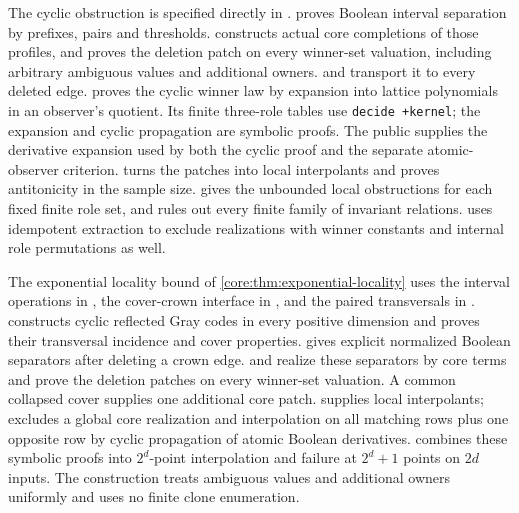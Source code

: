The cyclic obstruction is specified directly in
.
 proves Boolean interval separation by
prefixes, pairs and thresholds.  constructs
actual core completions of those profiles, and
 proves the deletion patch on every
winner-set valuation, including arbitrary ambiguous values and additional
owners.  and
 transport it to every deleted edge.
 proves the cyclic winner law by
expansion into lattice polynomials in an observer's quotient. Its finite
three-role tables use \texttt{decide +kernel}; the expansion and cyclic
propagation are symbolic proofs. The public
 supplies the derivative expansion used
by both the cyclic proof and the separate atomic-observer criterion. 
turns the patches into local interpolants and proves antitonicity in the
sample size.  gives the unbounded
local obstructions for each fixed finite role set, and
 rules out every finite
family of invariant relations. 
uses idempotent extraction to exclude realizations with winner constants
and internal role permutations as well.

The exponential locality bound of \cref{core:thm:exponential-locality}
uses the interval operations in ,
the cover-crown interface in , and
the paired transversals in .
 constructs cyclic reflected Gray codes in
every positive dimension and proves their transversal incidence and cover
properties.  gives explicit normalized
Boolean separators after deleting a crown edge.
 and
 realize these separators by
core terms and prove the deletion patches on every winner-set valuation.
A common collapsed cover supplies one additional core patch.
 supplies local interpolants;
 excludes a global core
realization and interpolation on all matching rows plus one opposite row
by cyclic propagation of atomic Boolean derivatives.
 combines these symbolic proofs into
$2^d$-point interpolation and failure at $2^d+1$ points on $2d$ inputs. The construction treats ambiguous values
and additional owners uniformly and uses no finite clone enumeration.

